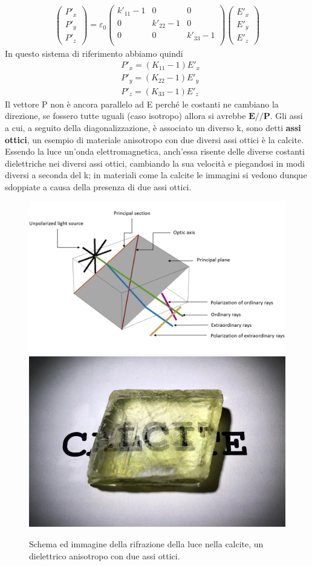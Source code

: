 \documentclass[
10pt, %
a4paper, %
oneside, %
headinclude,footinclude, %
BCOR5mm, %
]{scrartcl}
\begin{document}
\begin{align*}
	\begin{pmatrix}
		P'_x\\
		P'_y\\
		P'_z
	\end{pmatrix}
	=\varepsilon_0
	\begin{pmatrix}
		k'_{11}-1&0&0\\
		0&k'_{22}-1&0\\
		0&0&k'_{33}-1\\
	\end{pmatrix}
	\begin{pmatrix}
		E'_x\\
		E'_y\\
		E'_z
	\end{pmatrix}
\end{align*}
In questo sistema di riferimento abbiamo quindi
\begin{align*}
	&P'_x =(K_{11}-1)E'_x\\
	&P'_y =(K_{22}-1)E'_y\\
	&P'_z =(K_{33}-1)E'_z
\end{align*}
Il vettore P non è ancora parallelo ad E perché le costanti ne cambiano la direzione, se fossero tutte uguali (caso isotropo) allora si avrebbe \(\mathbf{E}//\mathbf{P}\). Gli assi a cui, a seguito della diagonalizzazione, è associato un diverso k, sono detti \textbf{assi ottici}, un esempio di materiale anisotropo con due diversi assi ottici è la calcite. Essendo la luce un'onda elettromagnetica, anch'essa risente delle diverse costanti dielettriche nei diversi assi ottici, cambiando la sua velocità e piegandosi in modi diversi a seconda del k; in materiali come la calcite le immagini si vedono dunque sdoppiate a causa della presenza di due assi ottici.
\begin{figure}[h!]
	\centering
	\includegraphics[width=0.6\linewidth]{../images/calcite1}\quad
	\includegraphics[width=0.4\linewidth]{../images/calcite2}
	\caption{Schema ed immagine della rifrazione della luce nella calcite, un dielettrico anisotropo con due assi ottici.}
	\label{fig:calcite1}
\end{figure}
\FloatBarrier
\end{document}
